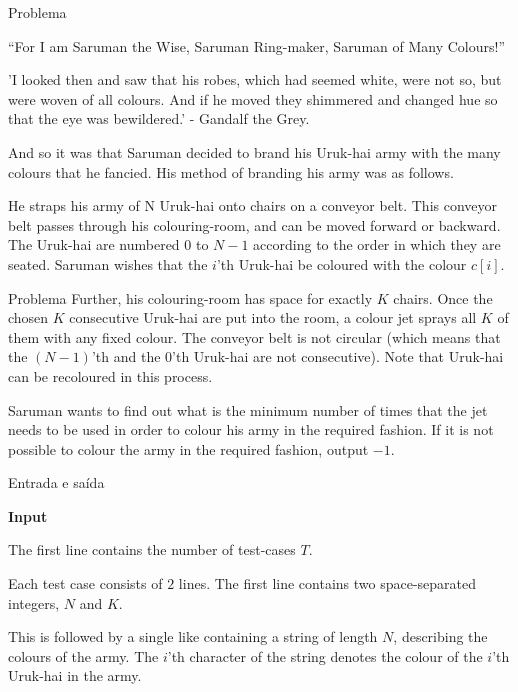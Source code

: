 
\begin{frame}[fragile]{Problema}


``For I am Saruman the Wise, Saruman Ring-maker, Saruman of Many Colours!''

'I looked then and saw that his robes, which had seemed white, were not so, but were woven of all colours. And if he moved they shimmered and changed hue so that the eye was bewildered.' - Gandalf the Grey.

And so it was that Saruman decided to brand his Uruk-hai army with the many colours that he fancied. His method of branding his army was as follows.

He straps his army of N Uruk-hai onto chairs on a conveyor belt. This conveyor belt passes through his colouring-room, and can be moved forward or backward. The Uruk-hai are numbered $0$ to $N-1$ according to the order in which they are seated. Saruman wishes that the $i$'th Uruk-hai be coloured with the colour $c[i]$.
\end{frame}

\begin{frame}[fragile]{Problema}
Further, his colouring-room has space for exactly $K$ chairs. Once the chosen $K$ consecutive Uruk-hai are put into the room, a colour jet sprays all $K$ of them with any fixed colour. The conveyor belt is not circular (which means that the $(N-1)$'th and the $0$'th Uruk-hai are not consecutive). Note that Uruk-hai can be recoloured in this process.

Saruman wants to find out what is the minimum number of times that the jet needs to be used in order to colour his army in the required fashion. If it is not possible to colour the army in the required fashion, output $-1$.
\end{frame}

\begin{frame}[fragile]{Entrada e saída}

\textbf{Input}

The first line contains the number of test-cases $T$.

Each test case consists of $2$ lines. The first line contains two space-separated integers, $N$ and $K$.

This is followed by a single like containing a string of length $N$, describing the colours of the army. The $i$'th character of the string denotes the colour of the $i$'th Uruk-hai in the army.
\end{frame}

